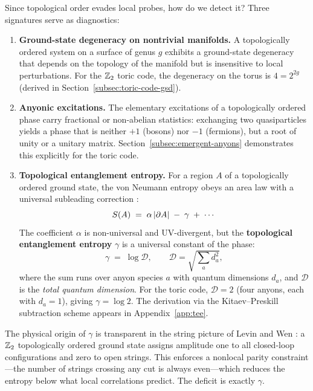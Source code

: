 Since topological order evades local probes, how do we detect it?  Three signatures serve as diagnostics:

\begin{enumerate}
    \item \textbf{Ground-state degeneracy on nontrivial manifolds.}  A topologically ordered system on a surface of genus $g$ exhibits a ground-state degeneracy that depends on the topology of the manifold but is insensitive to local perturbations.  For the $\mathbb{Z}_2$ toric code, the degeneracy on the torus is $4 = 2^{2g}$ (derived in Section~\ref{subsec:toric-code-gsd}).

    \item \textbf{Anyonic excitations.}  The elementary excitations of a topologically ordered phase carry fractional or non-abelian statistics: exchanging two quasiparticles yields a phase that is neither $+1$ (bosons) nor $-1$ (fermions), but a root of unity or a unitary matrix.  Section~\ref{subsec:emergent-anyons} demonstrates this explicitly for the toric code.

    \item \textbf{Topological entanglement entropy.}  For a region $A$ of a topologically ordered ground state, the von Neumann entropy obeys an area law with a universal subleading correction \cite{KitaevPreskill2006TEE, LevinWen2006DetectingTO}:
    \begin{equation}\label{eq:tee}
        S(A) \;=\; \alpha \, |\partial A| \;-\; \gamma \;+\; \cdots
    \end{equation}
    The coefficient $\alpha$ is non-universal and UV-divergent, but the \textbf{topological entanglement entropy} $\gamma$ is a universal constant of the phase:
    \begin{equation}\label{eq:total-quantum-dimension}
        \gamma \;=\; \log \mathcal{D}, \qquad \mathcal{D} = \sqrt{\sum_a d_a^2},
    \end{equation}
    where the sum runs over anyon species $a$ with quantum dimensions $d_a$, and $\mathcal{D}$ is the \emph{total quantum dimension}.  For the toric code, $\mathcal{D} = 2$ (four anyons, each with $d_a = 1$), giving $\gamma = \log 2$.  The derivation via the Kitaev--Preskill subtraction scheme appears in Appendix~\ref{app:tee}.
\end{enumerate}

The physical origin of $\gamma$ is transparent in the string picture of Levin and Wen \cite{LevinWen2006DetectingTO}: a $\mathbb{Z}_2$ topologically ordered ground state assigns amplitude one to all closed-loop configurations and zero to open strings.  This enforces a nonlocal parity constraint---the number of strings crossing any cut is always even---which reduces the entropy below what local correlations predict.  The deficit is exactly $\gamma$.

